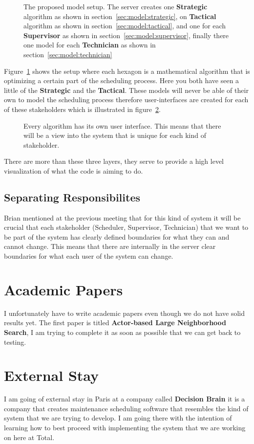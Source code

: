 \begin{figure}[H]
	\centering
    \drawModelSetupHexagon[userinterface=false, persistence=false, metaheuristics=true]
	\caption{The proposed model setup. The server creates one \textbf{Strategic} algorithm as shown in section~\ref{sec:model:strategic}, 
	on \textbf{Tactical} algorithm as shown in section~\ref{sec:model:tactical}, and 
	one for each \textbf{Supervisor} as shown in section~\ref{sec:model:supervisor}, 
	finally there one model for each \textbf{Technician} as shown in section~\ref{sec:model:technician}}
	\label{fig:hexagon:metaheuristics}
\end{figure}
Figure~\ref{fig:hexagon:metaheuristics} 
shows the setup where each hexagon is a mathematical algorithm that is optimizing
a certain part of the scheduling process. Here you both have seen a little of the \textbf{Strategic}
and the \textbf{Tactical}. These models will never be able of their own to model the scheduling process therefore user-interfaces are 
created for each of these stakeholders which is illustrated in figure~\ref{fig:hexagon:userinterfaces}.

\begin{figure}[H]
	\centering
    \drawModelSetupHexagon[userinterface=true, persistence=false, metaheuristics=false]
	\caption{Every algorithm has its own user interface. This means that there will be a view into the system that is 
	unique for each kind of stakeholder.}
	\label{fig:hexagon:userinterfaces}
\end{figure}

There are more than these three layers, they serve to provide a high level visualization of what the code is aiming to do.

\subsection{Separating Responsibilites}
Brian mentioned at the previous meeting that for this kind of system it will be crucial that
each stakeholder (Scheduler, Supervisor, Technician) that we want to be part of the system has 
clearly defined boundaries for what they can and cannot change. This means that there are internally
in the server clear boundaries for what each user of the system can change.

\section{Academic Papers}
I unfortunately have to write academic papers even though we do not have solid results yet.
The first paper
is titled \textbf{Actor-based Large Neighborhood Search}, I am trying to complete it as 
soon as possible that we can get back to testing.

\section{External Stay}
I am going of external stay in Paris at a company called \textbf{Decision Brain} it is a 
company that creates maintenance scheduling software that resembles the kind of system 
that we are trying to develop. I am going there with the intention of learning how to
best proceed with implementing the system that we are working on here at Total.

